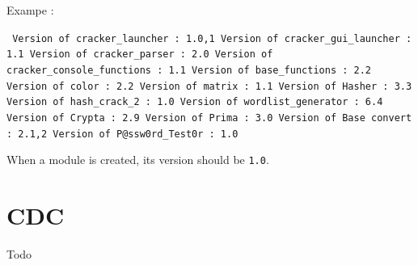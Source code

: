 \documentclass[a4paper,10pt]{report}
\begin{document}
   \noindent Exampe :
    \begin{framed}
     \texttt{
		 \noindent Version of cracker\_launcher : 1.0,1 \newline
		 \indent Version of cracker\_gui\_launcher : 1.1 \newline
		 \indent Version of cracker\_parser : 2.0 \newline \newline
		 \indent Version of cracker\_console\_functions : 1.1 \newline
		 \indent Version of base\_functions : 2.2 \newline
		 \indent Version of color : 2.2 \newline
		 \indent Version of matrix : 1.1 \newline \newline
		 \indent Version of Hasher : 3.3 \newline
		 \indent Version of hash\_crack\_2 : 1.0 \newline
		 \indent Version of wordlist\_generator : 6.4 \newline
		 \indent Version of Crypta : 2.9 \newline
		 \indent Version of Prima : 3.0 \newline
		 \indent Version of Base convert : 2.1,2 \newline
		 \indent Version of P@ssw0rd\_Test0r : 1.0}
    \end{framed}
    
    \noindent When a module is created, its version should be \texttt{1.0}.

  
  \section{CDC}
   Todo
 
\end{document}
